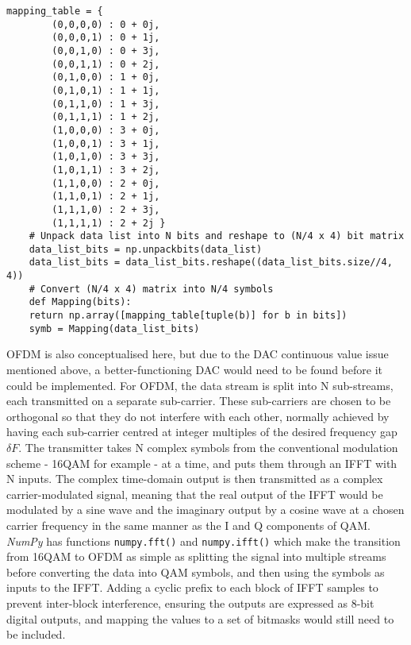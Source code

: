 \documentclass[../main.tex]{subfiles}
\begin{document}
\leading{19pt}
\begin{lstlisting}[caption={Inverted QAM Constellation and its use to encode each byte as two symbols}, label={lst_Inverted QAM}, basicstyle=\footnotesize]
	mapping_table = {
		(0,0,0,0) : 0 + 0j,
		(0,0,0,1) : 0 + 1j,
		(0,0,1,0) : 0 + 3j,
		(0,0,1,1) : 0 + 2j,
		(0,1,0,0) : 1 + 0j,
		(0,1,0,1) : 1 + 1j,
		(0,1,1,0) : 1 + 3j,
		(0,1,1,1) : 1 + 2j,
		(1,0,0,0) : 3 + 0j,
		(1,0,0,1) : 3 + 1j,
		(1,0,1,0) : 3 + 3j,
		(1,0,1,1) : 3 + 2j,
		(1,1,0,0) : 2 + 0j,
		(1,1,0,1) : 2 + 1j,
		(1,1,1,0) : 2 + 3j,
		(1,1,1,1) : 2 + 2j }
	# Unpack data list into N bits and reshape to (N/4 x 4) bit matrix
	data_list_bits = np.unpackbits(data_list)
	data_list_bits = data_list_bits.reshape((data_list_bits.size//4, 4))
	# Convert (N/4 x 4) matrix into N/4 symbols
	def Mapping(bits):
	return np.array([mapping_table[tuple(b)] for b in bits])
	symb = Mapping(data_list_bits)
\end{lstlisting}
\leading{22.7pt}

OFDM is also conceptualised here, but due to the DAC continuous value issue mentioned above, a better-functioning DAC would need to be found before it could be implemented.
For OFDM, the data stream is split into N sub-streams, each transmitted on a separate sub-carrier.
These sub-carriers are chosen to be orthogonal so that they do not interfere with each other, normally achieved by having each sub-carrier centred at integer multiples of the desired frequency gap $\delta F$.
The transmitter takes N complex symbols from the conventional modulation scheme - 16QAM for example - at a time, and puts them through an IFFT  with N inputs.
The complex time-domain output is then transmitted as a complex carrier-modulated signal, meaning that the real output of the IFFT would be modulated by a sine wave and the imaginary output by a cosine wave at a chosen carrier frequency in the same manner as the I and Q components of QAM.
\textit{NumPy} has functions \colorbox{backcolour}{\lstinline{numpy.fft()}} and \colorbox{backcolour}{\lstinline{numpy.ifft()}} which make the transition from 16QAM to OFDM as simple as splitting the signal into multiple streams before converting the data into QAM symbols, and then using the symbols as inputs to the IFFT.
Adding a cyclic prefix to each block of IFFT samples to prevent inter-block interference, ensuring the outputs are expressed as 8-bit digital outputs, and mapping the values to a set of bitmasks would still need to be included.\\
\end{document}
